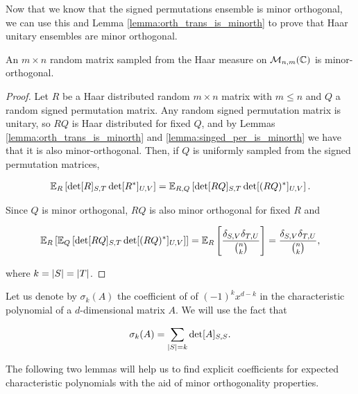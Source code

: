 Now that we know that the signed permutations ensemble is minor orthogonal, we can use this and Lemma \ref{lemma:orth_trans_is_minorth} to prove that Haar unitary ensembles are minor orthogonal.


\begin{corollary}
    An $m\times n$ random matrix sampled from the Haar measure on $\mathcal M_{n,m}(\mathbb C)$ is minor-orthogonal.
\end{corollary}

\begin{proof}
    Let $R$ be a Haar distributed random $m\times n$ matrix with $m \le n$ and $Q$ a random signed permutation matrix. Any random signed permutation matrix is unitary, so $RQ$ is Haar distributed for fixed $Q$, and by Lemmas \ref{lemma:orth_trans_is_minorth} and \ref{lemma:singed_per_is_minorth} we have that it is also minor-orthogonal. Then, if $Q$ is uniformly sampled from the signed permutation matrices,

    \begin{align*}
        \mathbb E_R\left[ \det[R]_{S,T}\det[R^*]_{U,V} \right] = \mathbb E_{R,Q}\left[ \det[RQ]_{S,T} \det[(RQ)^*]_{U,V}\right]. 
    \end{align*}

    Since $Q$ is minor orthogonal, $RQ$ is also minor orthogonal for fixed $R$ and 

    \begin{align*}
        \mathbb E_R\left[ \mathbb E_Q \left[ \det[RQ]_{S,T}\det[(RQ)^*]_{U,V} \right] \right] = \mathbb E_R\left[ \frac{\delta_{S,V}\delta_{T,U}}{\binom{n}{k}}\right] = \frac{\delta_{S,V}\delta_{T,U}}{\binom{n}{k}},
    \end{align*}

    \noindent where $k = \lvert S \rvert = \lvert T \rvert$. 
\end{proof}




Let us denote by $\sigma_k(A)$ the coefficient of of $(-1)^{k}x^{d-k}$ in the characteristic polynomial of a $d$-dimensional matrix $A$. We will use the fact that 

\begin{equation*}
    \sigma_k(A) = \sum_{\lvert S \rvert = k} \det[A]_{S,S}.
\end{equation*}

The following two lemmas will help us to find explicit coefficients for expected characteristic polynomials with the aid of minor orthogonality properties.

